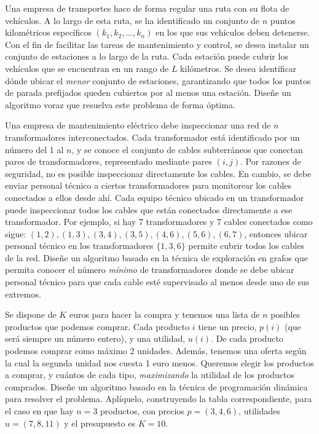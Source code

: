 \documentclass[12pt]{article}
\begin{document}
    \begin{ejercicio}[2 puntos]
        Una empresa de transportes hace de forma regular una ruta con su flota de vehículos. A lo largo de esta ruta, se ha identificado un conjunto de $n$ puntos kilométricos específicos $(k_1, k_2, \ldots, k_n)$ en los que sus vehículos deben detenerse. Con el fin de facilitar las tareas de mantenimiento y control, se desea instalar un conjunto de estaciones a lo largo de la ruta. Cada estación puede cubrir los vehículos que se encuentran en un rango de $L$ kilómetros. Se desea identificar dónde ubicar el \textit{menor} conjunto de estaciones, garantizando que todos los puntos de parada prefijados queden cubiertos por al menos una estación. Diseñe un algoritmo voraz que resuelva este problema de forma óptima.
    \end{ejercicio}

    \begin{ejercicio}[2 puntos]
        Una empresa de mantenimiento eléctrico debe inspeccionar una red de $n$ transformadores interconectados.  Cada transformador está identificado por un número del 1 al $n$, y se conoce el conjunto de cables subterráneos que conectan pares de transformadores, representado mediante pares $(i,j)$. Por razones de seguridad, no es posible inspeccionar directamente los cables. En cambio, se debe enviar personal técnico a ciertos transformadores para monitorear los cables conectados a ellos desde ahí. Cada equipo técnico ubicado en un transformador puede inspeccionar todos los cables que están conectados directamente a ese transformador. Por ejemplo, si hay 7 transformadores y 7 cables conectados como sigue: $(1, 2), (1, 3), (3, 4), (3, 5), (4, 6), (5, 6), (6, 7)$, entonces ubicar personal técnico en los transformadores $\{1,3,6\}$ permite cubrir todos los cables de la red. Diseñe un algoritmo basado en la técnica de exploración en grafos que permita conocer el número \textit{mínimo} de transformadores donde se debe ubicar personal técnico para que cada cable esté supervisado al menos desde uno de sus extremos.
    \end{ejercicio}

    \begin{ejercicio}[2 puntos]
        Se dispone de $K$ euros para hacer la compra y tenemos una lista de $n$ posibles productos que podemos comprar. Cada producto $i$ tiene un precio, $p(i)$ (que será siempre un número entero), y una utilidad, $u(i)$. De cada producto podemos comprar como máximo 2 unidades. Además, tenemos una oferta según la cual la segunda unidad nos cuesta 1 euro menos. Queremos elegir los productos a comprar, y cuántos de cada tipo, \textit{maximizando} la utilidad de los productos comprados. Diseñe un algoritmo basado en la técnica de programación dinámica para resolver el problema. Aplíquelo, construyendo la tabla correspondiente, para el caso en que hay $n= 3$ productos, con precios $p = (3,4,6)$, utilidades $u=(7,8,11)$ y el presupuesto es $K=10$.
    \end{ejercicio}
\end{document}
